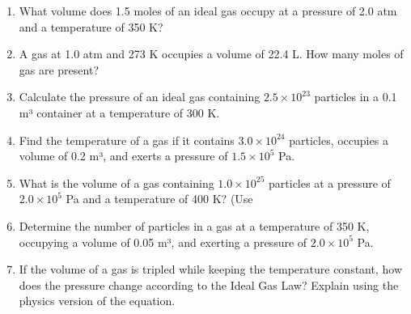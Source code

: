 \documentclass[letterpaper, 12pt]{article}
\begin{document}
\begin{enumerate}
	\item What volume does 1.5 moles of an ideal gas occupy at a pressure of 2.0 atm and a temperature of 350 K? 
	\vspace{0.65in}
	
	\item A gas at 1.0 atm and 273 K occupies a volume of 22.4 L. How many moles of gas are present? 
	\vspace{0.65in}
	
	\item Calculate the pressure of an ideal gas containing \(2.5 \times 10^{23}\) particles in a 0.1 m³ container at a temperature of 300 K. 
	\vspace{0.65in}
	
	\item Find the temperature of a gas if it contains \(3.0 \times 10^{24}\) particles, occupies a volume of 0.2 m³, and exerts a pressure of \(1.5 \times 10^5\) Pa. 
	\vspace{0.65in}
	
	\item What is the volume of a gas containing \(1.0 \times 10^{25}\) particles at a pressure of \(2.0 \times 10^5\) Pa and a temperature of 400 K? (Use 
	\vspace{0.65in}
	
	\item Determine the number of particles in a gas at a temperature of 350 K, occupying a volume of 0.05 m³, and exerting a pressure of \(2.0 \times 10^5\) Pa.
	\vspace{0.65in}
	
	\item If the volume of a gas is tripled while keeping the temperature constant, how does the pressure change according to the Ideal Gas Law? Explain using the physics version of the equation.
	\vspace{0.65in}
\end{enumerate}

 
\end{document}
